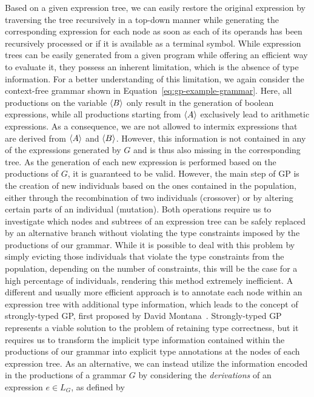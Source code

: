 Based on a given expression tree, we can easily restore the original expression by traversing the tree recursively in a top-down manner while generating the corresponding expression for each node as soon as each of its operands has been recursively processed or if it is available as a terminal symbol.
While expression trees can be easily generated from a given program while offering an efficient way to evaluate it, they possess an inherent limitation, which is the absence of type information.
For a better understanding of this limitation, we again consider the context-free grammar shown in Equation~\eqref{eq:gp-example-grammar}.
Here, all productions on the variable $\langle B \rangle$ only result in the generation of boolean expressions, while all productions starting from $\langle A \rangle$ exclusively lead to arithmetic expressions.
As a consequence, we are not allowed to intermix expressions that are derived from $\langle A \rangle$ and $\langle B \rangle$.
However, this information is not contained in any of the expressions generated by $G$ and is thus also missing in the corresponding tree.
As the generation of each new expression is performed based on the productions of $G$, it is guaranteed to be valid.
However, the main step of GP is the creation of new individuals based on the ones contained in the population, either through the recombination of two individuals (crossover) or by altering certain parts of an individual (mutation). 
Both operations require us to investigate which nodes and subtrees of an expression tree can be safely replaced by an alternative branch without violating the type constraints imposed by the productions of our grammar.
While it is possible to deal with this problem by simply evicting those individuals that violate the type constraints from the population, depending on the number of constraints, this will be the case for a high percentage of individuals, rendering this method extremely inefficient.
A different and usually more efficient approach is to annotate each node within an expression tree with additional type information, which leads to the concept of strongly-typed GP, first proposed by David Montana~\cite{montana1995strongly}.
Strongly-typed GP represents a viable solution to the problem of retaining type correctness, but it requires us to transform the implicit type information contained within the productions of our grammar into explicit type annotations at the nodes of each expression tree.
As an alternative, we can instead utilize the information encoded in the productions of a grammar $G$ by considering the \emph{derivations} of an expression $e \in L_G$, as defined by

